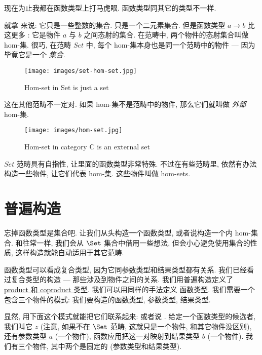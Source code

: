 
\lettrine[lhang=0.17]{现}{在}为止我都在函数类型上打马虎眼. 函数类型同其它的类型不一样.

就拿  来说: 它只是一些整数的集合.  只是一个二元素集合. 但是函数类型 $a\to b$ 比这更多
: 它是物件 $a$ 与 $b$ 之间态射的集合. 在范畴中, 两个物件的态射集合叫做 hom-集. 很巧, 在范畴 $Set$ 中, 每个
hom-集本身也是同一个范畴中的物件 --- 因为毕竟它是一个 \emph{集合}.

\begin{figure}[H]
  \centering
  \texttt{[image: images/set-hom-set.jpg]}
  \caption{Hom-set in Set is just a set}
\end{figure}

\noindent
这在其他范畴不一定对. 如果 hom-集不是范畴中的物件, 那么它们就叫做 \emph{外部} hom-集.

\begin{figure}[H]
  \centering
  \texttt{[image: images/hom-set.jpg]}
  \caption{Hom-set in category C is an external set}
\end{figure}

\noindent
$Set$ 范畴具有自指性, 让里面的函数类型非常特殊. 不过在有些范畴里, 依然有办法构造一些物件, 让它们代表 hom-集.
这些物件叫做  hom-sets.

\section{普遍构造}

忘掉函数类型是集合吧. 让我们从头构造一个函数类型, 或者说构造一个内 hom-集合. 和往常一样, 我们会从 $\Set$
集合中借用一些想法, 但会小心避免使用集合的性质, 这样构造就能自动适用于其它范畴.

函数类型可以看成复合类型, 因为它同参数类型和结果类型都有关系. 我们已经看过复合类型的构造 --- 那些涉及到物件之间的关系.
我们用普遍构造定义了 \hyperref[products-and-coproducts]{product 和 coproduct 类型}. 我们可以用同样的手法定义
函数类型. 我们需要一个包含三个物件的模式: 我们要构造的函数类型, 参数类型, 结果类型.

显然, 用下面这个模式就能把它们联系起来:  或者说 .
给定一个函数类型的候选者, 我们叫它 $z$ (注意, 如果不在 $\Set$ 范畴, 这就只是一个物件, 和其它物件没区别), 还有参数类型
 $a$ (一个物件), 函数应用把这一对映射到结果类型 $b$ (一个物件). 我们有三个物件, 其中两个是固定的 (参数类型和结果类型).

